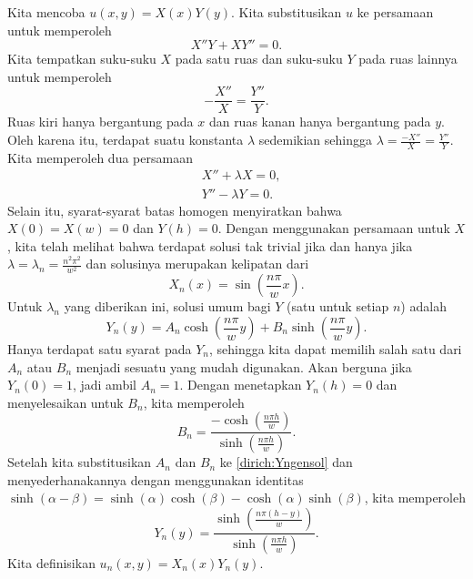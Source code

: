 Kita mencoba $u(x,y) = X(x)Y(y)$.  Kita substitusikan $u$ ke persamaan untuk memperoleh
\begin{equation*}
X''Y + XY'' = 0 .
\end{equation*}
Kita tempatkan suku-suku $X$ pada satu ruas dan suku-suku $Y$ pada ruas lainnya untuk memperoleh
\begin{equation*}
- \frac{X''}{X} = \frac{Y''}{Y} .
\end{equation*}
Ruas kiri hanya bergantung pada $x$ dan ruas kanan hanya bergantung
pada $y$.  Oleh karena itu, terdapat suatu konstanta $\lambda$ sedemikian sehingga
$\lambda = \frac{-X''}{X} = \frac{Y''}{Y}$.
Kita memperoleh dua persamaan
\begin{align*}
& X'' + \lambda X = 0 , \\
& Y'' - \lambda Y = 0 .
\end{align*}
Selain itu, syarat-syarat batas homogen menyiratkan bahwa
$X(0) = X(w) = 0$ dan $Y(h) = 0$.  Dengan menggunakan persamaan untuk $X$,
kita telah melihat bahwa terdapat solusi tak trivial jika dan hanya jika
$\lambda = \lambda_n = \frac{n^2 \pi^2}{w^2}$ dan solusinya merupakan
kelipatan dari
\begin{equation*}
X_n(x) = \sin \left( \frac{n \pi}{w} x \right) .
\end{equation*}
Untuk $\lambda_n$ yang diberikan ini,
solusi umum bagi $Y$ (satu untuk setiap $n$) adalah
\begin{equation} \label{dirich:Yngensol}
Y_n(y) = A_n \cosh \left( \frac{n \pi}{w} y \right)
+ B_n \sinh \left( \frac{n \pi}{w} y \right) .
\end{equation}
Hanya terdapat satu syarat pada $Y_n$, sehingga kita dapat memilih salah satu dari $A_n$
atau $B_n$
menjadi sesuatu yang mudah digunakan.
Akan berguna jika $Y_n(0) = 1$, jadi ambil $A_n=1$.
Dengan menetapkan $Y_n(h) = 0$ dan menyelesaikan untuk $B_n$, kita memperoleh
\begin{equation*}
B_n = \frac{- \cosh \left( \frac{n \pi h }{w} \right)}%
{\sinh \left( \frac{n \pi h }{w} \right)} .
\end{equation*}
Setelah kita substitusikan $A_n$ dan $B_n$
ke \eqref{dirich:Yngensol} dan menyederhanakannya dengan menggunakan
identitas $\sinh(\alpha-\beta) =
\sinh(\alpha) \cosh(\beta) -
\cosh(\alpha) \sinh(\beta)$, kita memperoleh
\begin{equation*}
Y_n(y) =
\frac{\sinh \left( \frac{n \pi (h-y) }{w} \right)}%
{\sinh \left( \frac{n \pi h }{w} \right)} .
\end{equation*}
Kita definisikan $u_n(x,y) = X_n(x)Y_n(y)$.
